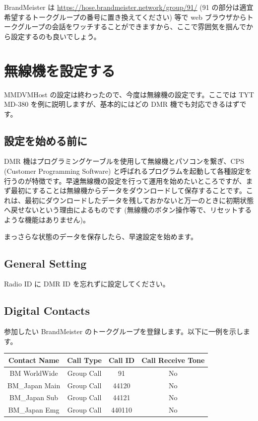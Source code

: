 \documentclass[a4j,oneside]{ujbook}
\begin{document}
BrandMeister は \url{https://hose.brandmeister.network/group/91/} (91 の部分は適宜希望するトークグループの番号に置き換えてください) 等で web ブラウザからトークグループの会話をワッチすることができますから、ここで雰囲気を掴んでから設定するのも良いでしょう。

\section{無線機を設定する}

MMDVMHost の設定は終わったので、今度は無線機の設定です。ここでは TYT MD-380 を例に説明しますが、基本的にはどの DMR 機でも対応できるはずです。

\subsection*{設定を始める前に}

DMR 機はプログラミングケーブルを使用して無線機とパソコンを繋ぎ、CPS (Customer Programming Software) と呼ばれるプログラムを起動して各種設定を行うのが特徴です。早速無線機の設定を行って運用を始めたいところですが、まず最初にすることは無線機からデータをダウンロードして保存することです。これは、最初にダウンロードしたデータを残しておかないと万一のときに初期状態へ戻せないという理由によるものです (無線機のボタン操作等で、リセットするような機能はありません)。

まっさらな状態のデータを保存したら、早速設定を始めます。

\subsection*{General Setting}

Radio ID に DMR ID を忘れずに設定してください。

\subsection*{Digital Contacts}

参加したい BrandMeister のトークグループを登録します。以下に一例を示します。

\begin{center}
 \begin{tabular}{|c|c|c|c|}
  \hline
  {Contact Name} & {Call Type} & {Call ID} & {Call Receive Tone} \\
  \hline
  {BM WorldWide} & {Group Call} & 91 & No \\
  {BM\_Japan Main} & {Group Call} & 44120 & No \\
  {BM\_Japan Sub} & {Group Call} & 44121 & No \\
  {BM\_Japan Emg} & {Group Call} & 440110 & No \\
  \hline
 \end{tabular}
\end{center}
\end{document}
